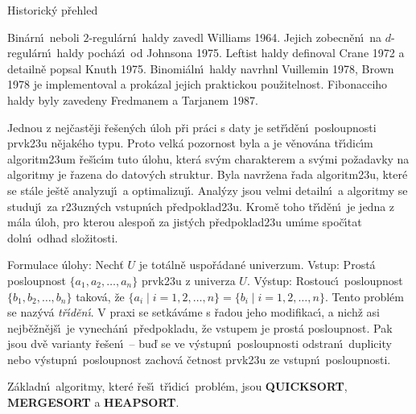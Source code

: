 \head
Historick\'y p\v rehled
\endhead

\flushpar Bin\'arn\'\i\ neboli $2$-regul\'arn\'\i\ haldy 
zavedl Williams 1964.  Jejich zobecn\v en\'\i\ na $d$-regul\'arn\'\i\ haldy 
poch\'az\'\i\ od Johnsona 1975.  Leftist haldy definoval Crane 1972 a 
detailn\v e popsal Knuth 1975.  Binomi\'aln\'\i\ haldy navrhnl Vuillemin 
1978, Brown 1978 je implementoval a prok\'azal jejich praktickou 
pou\v zitelnost.  Fibonacciho haldy byly zavedeny Fredmanem a 
Tarjanem 1987.  
\newpage

\centerline{}
\bigskip

\flushpar Jednou z nej\v cast\v eji \v re\v sen\'ych \'uloh p\v ri pr\'aci s 
daty je set\v r\'\i d\v en\'\i\ 
posloupnosti prvk\accent23u n\v ejak\'eho typu. Proto velk\'a pozornost byla a je v\v enov\'ana 
t\v r\'\i dic\'\i m algoritm\accent23um \v re\v s\'\i c\'\i m tuto \'ulohu, kter\'a 
sv\'ym charakterem a sv\'ymi 
po\v zadavky na algoritmy je \v razena do datov\'ych 
struktur. Byla navr\v zena \v rada algoritm\accent23u, kter\'e se 
st\'ale je\v st\v e analyzuj\'\i\ a optimalizuj\'\i . Anal\'yzy jsou velmi detailn\'\i\ a algoritmy se 
studuj\'\i\ za r\accent23uzn\'ych vstupn\'\i ch p\v redpoklad\accent23u. 
Krom\v e toho t\v r\'\i d\v en\'\i\ je jedna z m\'ala \'uloh, pro kterou 
alespo\v n za jist\'ych 
p\v redpoklad\accent23u um\'\i me spo\v c\'\i tat doln\'\i\ odhad slo\v zitosti.
\medskip

\flushpar Formulace \'ulohy:\newline 
Nech\v t $U$ je tot\'aln\v e uspo\v r\'adan\'e univerzum.\newline 
Vstup: Prost\'a posloupnost $\{a_1,a_2,\dots,a_n\}$ prvk\accent23u z 
univerza $U$.\newline 
V\'ystup: Rostouc\'\i\ posloupnost $\{b_1,b_2,\dots,b_n\}$ takov\'a, \v ze 
$\{a_i\mid i=1,2,\dots,n\}=\{b_i\mid i=1,2,\dots,n\}$.\newline 
Tento probl\'em se naz\'yv\'a \emph{t\v r\'\i d\v en\'\i}. 
V praxi se setk\'av\'ame s \v radou jeho modifikac\'\i , a nich\v z 
asi nejb\v e\v zn\v ej\v s\'\i\ je vynech\'an\'\i\ p\v redpokladu, \v ze 
vstupem je prost\'a posloupnost. Pak jsou dv\v e varianty 
\v re\v sen\'\i\ -- bu\v d se ve v\'ystupn\'\i\ posloupnosti odstran\'\i\ 
duplicity nebo v\'ystupn\'\i\ posloupnost zachov\'a \v cetnost prvk\accent23u ze 
vstupn\'\i\ posloupnosti.
\medskip

\flushpar Z\'akladn\'\i\ algoritmy, kter\'e  \v re\v s\'\i\ t\v r\'\i dic\'\i\ 
probl\'em, jsou {\bf QUICKSORT}, {\bf MERGESORT} a {\bf HEAP\-SORT}. 
\bigskip

